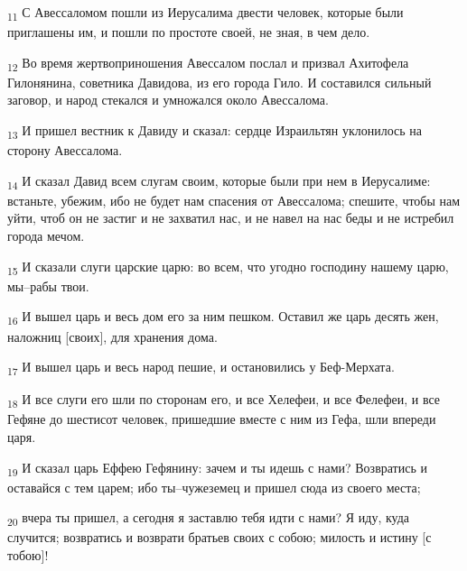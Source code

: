 \begin{tcolorbox}
\textsubscript{11} С Авессаломом пошли из Иерусалима двести человек, которые были приглашены им, и пошли по простоте своей, не зная, в чем дело.
\end{tcolorbox}
\begin{tcolorbox}
\textsubscript{12} Во время жертвоприношения Авессалом послал и призвал Ахитофела Гилонянина, советника Давидова, из его города Гило. И составился сильный заговор, и народ стекался и умножался около Авессалома.
\end{tcolorbox}
\begin{tcolorbox}
\textsubscript{13} И пришел вестник к Давиду и сказал: сердце Израильтян уклонилось на сторону Авессалома.
\end{tcolorbox}
\begin{tcolorbox}
\textsubscript{14} И сказал Давид всем слугам своим, которые были при нем в Иерусалиме: встаньте, убежим, ибо не будет нам спасения от Авессалома; спешите, чтобы нам уйти, чтоб он не застиг и не захватил нас, и не навел на нас беды и не истребил города мечом.
\end{tcolorbox}
\begin{tcolorbox}
\textsubscript{15} И сказали слуги царские царю: во всем, что угодно господину нашему царю, мы--рабы твои.
\end{tcolorbox}
\begin{tcolorbox}
\textsubscript{16} И вышел царь и весь дом его за ним пешком. Оставил же царь десять жен, наложниц [своих], для хранения дома.
\end{tcolorbox}
\begin{tcolorbox}
\textsubscript{17} И вышел царь и весь народ пешие, и остановились у Беф-Мерхата.
\end{tcolorbox}
\begin{tcolorbox}
\textsubscript{18} И все слуги его шли по сторонам его, и все Хелефеи, и все Фелефеи, и все Гефяне до шестисот человек, пришедшие вместе с ним из Гефа, шли впереди царя.
\end{tcolorbox}
\begin{tcolorbox}
\textsubscript{19} И сказал царь Еффею Гефянину: зачем и ты идешь с нами? Возвратись и оставайся с тем царем; ибо ты--чужеземец и пришел сюда из своего места;
\end{tcolorbox}
\begin{tcolorbox}
\textsubscript{20} вчера ты пришел, а сегодня я заставлю тебя идти с нами? Я иду, куда случится; возвратись и возврати братьев своих с собою; милость и истину [с тобою]!
\end{tcolorbox}
